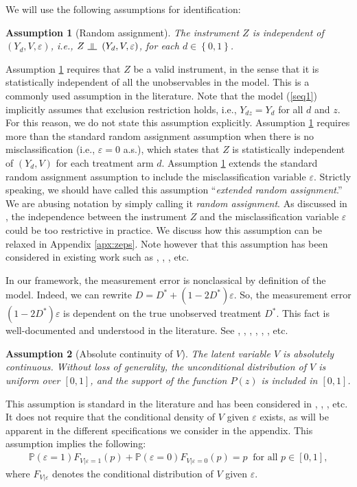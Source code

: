 \documentclass[11pt,reqno]{amsart}
\newcommand{\indep}{\rotatebox[origin=c]{90}{$\models$}}
\theoremstyle{plain}
\newtheorem{assumption}{Assumption}
\numberwithin{equation}{section}
\begin{document}
We will use the following assumptions for identification:
\begin{assumption}[Random assignment]\label{RA}
The instrument $Z$ is independent of $\left(Y_d,V,\varepsilon\right)$, i.e., $Z\ \indep\ \left(Y_d,V,\varepsilon\right)$, for each $d\in \left\{0,1\right\}$.
\end{assumption}
Assumption \ref{RA} requires that $Z$ be a valid instrument, in the sense that it is statistically independent of all the unobservables in the model. This is a commonly used assumption in the literature. 
Note that the model (\ref{seq1}) implicitly assumes that exclusion restriction holds, i.e., $Y_{dz}=Y_d$ for all $d$ and $z$. For this reason, we do not state this assumption explicitly. Assumption \ref{RA} requires more than the standard random assignment assumption when there is no misclassification (i.e., $\varepsilon=0$ a.s.), which states that $Z$ is statistically independent of $(Y_d,V)$ for each treatment arm $d$. Assumption \ref{RA} extends the standard random assignment assumption to include the misclassification variable $\varepsilon$. Strictly speaking, we should have called this assumption ``\textit{extended random assignment}.'' We are abusing notation by simply calling it \textit{random assignment}. As discussed in \cite{Possebom2021}, the independence between the instrument $Z$ and the misclassification variable $\varepsilon$ could be too restrictive in practice. We discuss how this assumption can be relaxed in Appendix \ref{apx:zeps}. Note however that this assumption has been considered in existing work such as \cite{Ura2018}, \cite{Calvi_al2018}, \cite{Tommasi2020}, etc.

In our framework, the measurement error is nonclassical by definition of the model. Indeed, we can rewrite $D=D^*+(1-2D^*)\varepsilon$. So, the measurement error $(1-2D^*)\varepsilon$ is dependent on the true unobserved treatment $D^*$. This fact is well-documented and understood in the literature. See \cite{Aigner1973}, \cite{Mahajan2006}, \cite{Lewbel2007}, \cite{Kreideral2012}, \cite{Ura2018}, \cite{Yanagi2019}, etc. 

\begin{assumption}[Absolute continuity of $V$]\label{Cont}
The latent variable $V$ is absolutely continuous. Without loss of generality, the unconditional distribution of $V$ is uniform over $[0,1]$, and the support of the function $P(z)$ is included in $[0,1]$.
\end{assumption}
This assumption is standard in the literature and has been considered in \cite{heckman1999,heckman2001,heckman2005structural}, \cite{carneirolee2009}, \cite{checkman2010,heckman2011}, etc. It does not require that the conditional density of $V$ given $\varepsilon$ exists, as will be apparent in the different specifications we consider in the appendix. This assumption implies the following:
\begin{eqnarray}\label{eq:mix}
\mathbb P(\varepsilon=1)F_{V\vert \varepsilon=1}(p)+\mathbb P(\varepsilon=0)F_{V\vert \varepsilon=0}(p)=p\ \text{ for all } p\in[0,1],
\end{eqnarray}
where $F_{V\vert \varepsilon}$ denotes the conditional distribution of $V$ given $\varepsilon$.
\end{document}
